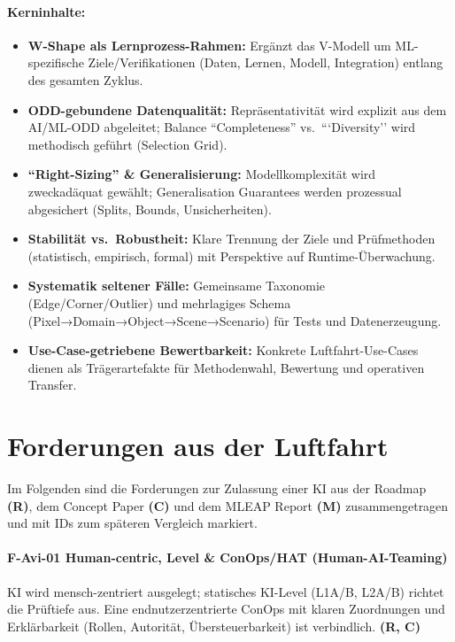 \paragraph{Kerninhalte:}
\begin{itemize}
  \item \textbf{W-Shape als Lernprozess-Rahmen:} Ergänzt das V-Modell um ML-spezifische Ziele/Verifikationen (Daten, Lernen, Modell, Integration) entlang des gesamten Zyklus.
  \item \textbf{ODD-gebundene Datenqualität:} Repräsentativität wird explizit aus dem AI/ML-ODD abgeleitet; Balance ``Completeness'' vs.\ ```Diversity'' wird methodisch geführt (Selection Grid).
  \item \textbf{``Right-Sizing'' \& Generalisierung:} Modellkomplexität wird zweckadäquat gewählt; Generalisation Guarantees werden prozessual abgesichert (Splits, Bounds, Unsicherheiten).
  \item \textbf{Stabilität vs.\ Robustheit:} Klare Trennung der Ziele und Prüfmethoden (statistisch, empirisch, formal) mit Perspektive auf Runtime-Überwachung.
  \item \textbf{Systematik seltener Fälle:} Gemeinsame Taxonomie (Edge/Corner/Outlier) und mehrlagiges Schema (Pixel→Domain→Object→Scene→Scenario) für Tests und Datenerzeugung.
  \item \textbf{Use-Case-getriebene Bewertbarkeit:} Konkrete Luftfahrt-Use-Cases dienen als Trägerartefakte für Methodenwahl, Bewertung und operativen Transfer.
\end{itemize}


\section{Forderungen aus der Luftfahrt}
Im Folgenden sind die Forderungen zur Zulassung einer KI aus der 
Roadmap \textbf{(R)}, dem Concept Paper \textbf{(C)} und dem MLEAP Report \textbf{(M)} 
zusammengetragen und mit IDs zum späteren Vergleich markiert.

\paragraph {F-Avi-01 Human-centric, Level \& ConOps/HAT (Human-AI-Teaming)}
  {KI wird mensch-zentriert ausgelegt; statisches KI-Level (L1A/B, L2A/B) richtet die Prüftiefe aus. 
  Eine endnutzerzentrierte ConOps mit klaren Zuordnungen und Erklärbarkeit (Rollen, Autorität, Übersteuerbarkeit) ist verbindlich. 
  \textbf{(R, C)}}

